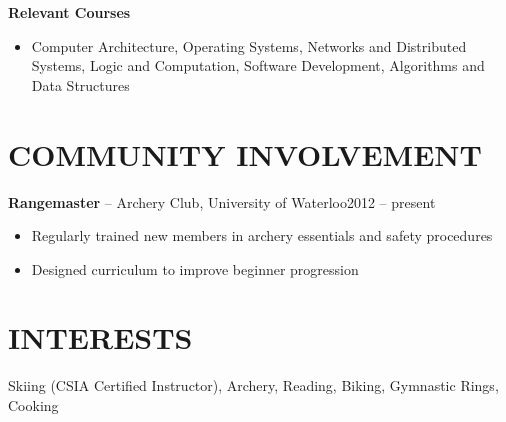 \documentclass{res}
\begin{document}
\begin{resume}
    {\bf Relevant Courses}
      \vspace{1mm}
      \begin{itemize}
       \item Computer Architecture, Operating Systems, Networks and Distributed Systems, Logic and Computation, Software Development, Algorithms and Data Structures
      \end{itemize}
    
    
\section{COMMUNITY INVOLVEMENT}
    \vspace{3mm}
    {\bf Rangemaster} -- Archery Club, University of Waterloo\hfill 2012 -- present\\
    \vspace{-2mm}
   \begin{itemize}
    \item Regularly trained new members in archery essentials and safety procedures
    \item Designed curriculum to improve beginner progression
   \end{itemize}
   
\section{INTERESTS}
  \vspace{1mm}
  Skiing (CSIA Certified Instructor), Archery, Reading, Biking, Gymnastic Rings, Cooking
  
 
\end{resume}
\end{document}
